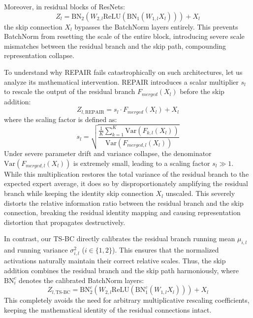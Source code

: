 \documentclass{article}
\theoremstyle{plain}
\theoremstyle{definition}
\theoremstyle{remark}
\begin{document}
Moreover, in residual blocks of ResNets:
\begin{equation}
Z_l = \mathrm{BN}_2(W_{2,l} \mathrm{ReLU}(\mathrm{BN}_1(W_{1,l} X_l))) + X_l
\end{equation}
the skip connection $X_l$ bypasses the BatchNorm layers entirely. This prevents BatchNorm from resetting the scale of the entire block, introducing severe scale mismatches between the residual branch and the skip path, compounding representation collapse.

To understand why REPAIR \cite{jordan2023repair} fails catastrophically on such architectures, let us analyze its mathematical intervention. REPAIR introduces a scalar multiplier $s_l$ to rescale the output of the residual branch $F_{merged}(X_l)$ before the skip addition:
\begin{equation}
Z_{l, \mathrm{REPAIR}} = s_l \cdot F_{merged}(X_l) + X_l
\end{equation}
where the scaling factor is defined as:
\begin{equation}
s_l = \sqrt{\frac{\frac{1}{K}\sum_{k=1}^K \mathrm{Var}(F_{k, l}(X_l))}{\mathrm{Var}(F_{merged, l}(X_l))}}
\end{equation}
Under severe parameter drift and variance collapse, the denominator $\mathrm{Var}(F_{merged, l}(X_l))$ is extremely small, leading to a scaling factor $s_l \gg 1$. While this multiplication restores the total variance of the residual branch to the expected expert average, it does so by disproportionately amplifying the residual branch while keeping the identity skip connection $X_l$ unscaled. This severely distorts the relative information ratio between the residual branch and the skip connection, breaking the residual identity mapping and causing representation distortion that propagates destructively.

In contrast, our TS-BC directly calibrates the residual branch running mean $\mu_{i,l}$ and running variance $\sigma^2_{i,l}$ ($i \in \{1, 2\}$). This ensures that the normalized activations naturally maintain their correct relative scales. Thus, the skip addition combines the residual branch and the skip path harmoniously, where $\mathrm{BN}^c_i$ denotes the calibrated BatchNorm layers:
\begin{equation}
Z_{l, \mathrm{TS\text{-}BC}} = \mathrm{BN}^c_2(W_{2,l} \mathrm{ReLU}(\mathrm{BN}^c_1(W_{1,l} X_l))) + X_l
\end{equation}
This completely avoids the need for arbitrary multiplicative rescaling coefficients, keeping the mathematical identity of the residual connections intact.
\end{document}
